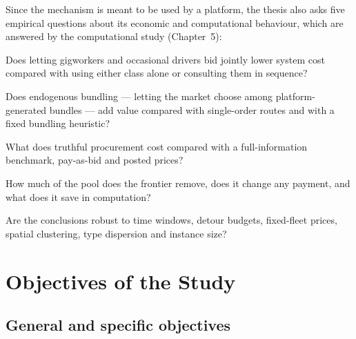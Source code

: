 Since the mechanism is meant to be used by a platform, the thesis also asks
five empirical questions about its economic and computational behaviour,
which are answered by the computational study (Chapter~5):

\begin{description}[leftmargin=1.2cm,style=nextline,itemsep=2pt]
\item[RQ1] Does letting gigworkers and occasional drivers bid jointly lower
system cost compared with using either class alone or consulting them in
sequence?
\item[RQ2] Does endogenous bundling --- letting the market choose among
platform-generated bundles --- add value compared with single-order routes
and with a fixed bundling heuristic?
\item[RQ3] What does truthful procurement cost compared with a
full-information benchmark, pay-as-bid and posted prices?
\item[RQ4] How much of the pool does the frontier remove, does it change any
payment, and what does it save in computation?
\item[RQ5] Are the conclusions robust to time windows, detour budgets,
fixed-fleet prices, spatial clustering, type dispersion and instance size?
\end{description}

\section{Objectives of the Study}
\label{sec:objectives}

\subsection{General and specific objectives}

